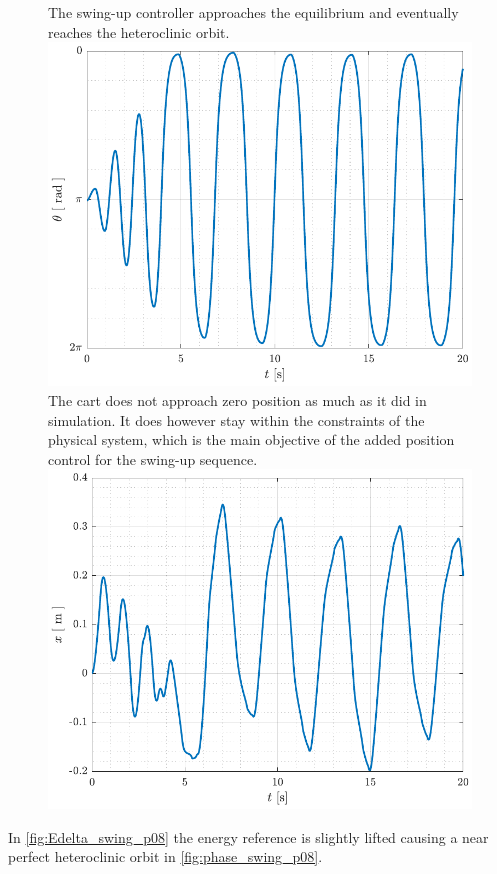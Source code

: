 \begin{figure}[H]
  \hspace{1cm}
  \captionbox
  {
    The swing-up controller approaches the equilibrium and eventually reaches the heteroclinic orbit.
    \label{fig:theta_swing_p08}
  }
  {
    \hspace{-1cm}
    \includegraphics[width=.395\textwidth]{figures/theta_swing_p08}
  }
  \hspace{20pt}
  \captionbox 
  {
    The cart does not approach zero position as much as it did in simulation. It does however stay within the constraints of the physical system, which is the main objective of the added position control for the swing-up sequence.
    \label{fig:x_swing_p08}
  }
  {
    \hspace{-1cm}
    \includegraphics[width=.4\textwidth]{figures/x_swing_p08}
  }  
\end{figure}
In \autoref{fig:Edelta_swing_p08} the energy reference is slightly lifted causing a near perfect heteroclinic orbit in \autoref{fig:phase_swing_p08}.

